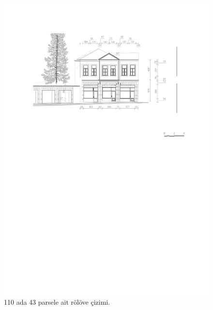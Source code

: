\begin{figure}
\centering
\includegraphics[width=1\textwidth,height=\textheight]{source/figures/Roloveler/R110-43.pdf}
\caption{110 ada 43 parsele ait rölöve çizimi.}
\end{figure}

